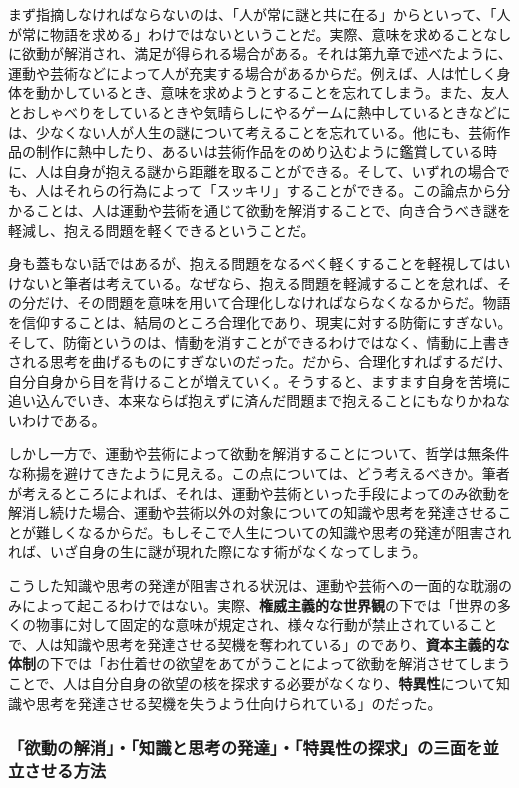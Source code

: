 まず指摘しなければならないのは、「人が常に謎と共に在る」からといって、「人が常に物語を求める」わけではないということだ。実際、意味を求めることなしに欲動が解消され、満足が得られる場合がある。それは第九章で述べたように、運動や芸術などによって人が充実する場合があるからだ。例えば、人は忙しく身体を動かしているとき、意味を求めようとすることを忘れてしまう。また、友人とおしゃべりをしているときや気晴らしにやるゲームに熱中しているときなどには、少なくない人が人生の謎について考えることを忘れている。他にも、芸術作品の制作に熱中したり、あるいは芸術作品をのめり込むように鑑賞している時に、人は自身が抱える謎から距離を取ることができる。そして、いずれの場合でも、人はそれらの行為によって「スッキリ」することができる。この論点から分かることは、人は運動や芸術を通じて欲動を解消することで、向き合うべき謎を軽減し、抱える問題を軽くできるということだ。

身も蓋もない話ではあるが、抱える問題をなるべく軽くすることを軽視してはいけないと筆者は考えている。なぜなら、抱える問題を軽減することを怠れば、その分だけ、その問題を意味を用いて合理化しなければならなくなるからだ。物語を信仰することは、結局のところ合理化であり、現実に対する防衛にすぎない。そして、防衛というのは、情動を消すことができるわけではなく、情動に上書きされる思考を曲げるものにすぎないのだった。だから、合理化すればするだけ、自分自身から目を背けることが増えていく。そうすると、ますます自身を苦境に追い込んでいき、本来ならば抱えずに済んだ問題まで抱えることにもなりかねないわけである。

しかし一方で、運動や芸術によって欲動を解消することについて、哲学は無条件な称揚を避けてきたように見える。この点については、どう考えるべきか。筆者が考えるところによれば、それは、運動や芸術といった手段によってのみ欲動を解消し続けた場合、運動や芸術以外の対象についての知識や思考を発達させることが難しくなるからだ。もしそこで人生についての知識や思考の発達が阻害されれば、いざ自身の生に謎が現れた際になす術がなくなってしまう。

こうした知識や思考の発達が阻害される状況は、運動や芸術への一面的な耽溺のみによって起こるわけではない。実際、\textbf{権威主義的な世界観}の下では「世界の多くの物事に対して固定的な意味が規定され、様々な行動が禁止されていることで、人は知識や思考を発達させる契機を奪われている」のであり、\textbf{資本主義的な体制}の下では「お仕着せの欲望をあてがうことによって欲動を解消させてしまうことで、人は自分自身の欲望の核を探求する必要がなくなり、\textbf{特異性}について知識や思考を発達させる契機を失うよう仕向けられている」のだった。

\subsubsection{「欲動の解消」・「知識と思考の発達」・「特異性の探求」の三面を並立させる方法}\label{ux6b32ux52d5ux306eux89e3ux6d88ux77e5ux8b58ux3068ux601dux8003ux306eux767aux9054ux7279ux7570ux6027ux306eux63a2ux6c42ux306eux4e09ux9762ux3092ux4e26ux7acbux3055ux305bux308bux65b9ux6cd5}

